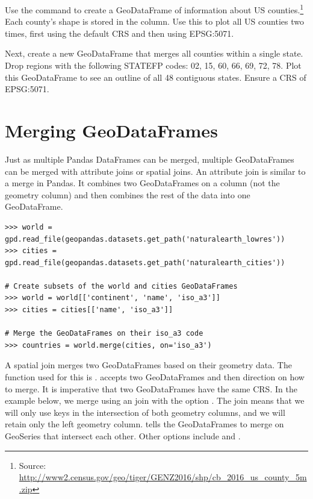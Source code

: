 \begin{problem}
Use the command  to create a GeoDataFrame of information about US counties.\footnote{Source: \url{http://www2.census.gov/geo/tiger/GENZ2016/shp/cb_2016_us_county_5m.zip}}
Each county's shape is stored in the  column.
Use this to plot all US counties two times, first using the default CRS and then using EPSG:5071.

Next, create a new GeoDataFrame that merges all counties within a single state.
Drop regions with the following STATEFP codes: 02, 15, 60, 66, 69, 72, 78.
Plot this GeoDataFrame to see an outline of all 48 contiguous states.
Ensure a CRS  of EPSG:5071.
\label{problem:us_counties}
\end{problem}

\section*{Merging GeoDataFrames} %

Just as multiple Pandas DataFrames can be merged, multiple GeoDataFrames can be merged with attribute joins or spatial joins.
An attribute join is similar to a merge in Pandas.
It combines two GeoDataFrames on a column (not the geometry column) and then combines the rest of the data into one GeoDataFrame.

\begin{lstlisting}
>>> world = gpd.read_file(geopandas.datasets.get_path('naturalearth_lowres'))
>>> cities = gpd.read_file(geopandas.datasets.get_path('naturalearth_cities'))

# Create subsets of the world and cities GeoDataFrames
>>> world = world[['continent', 'name', 'iso_a3']]
>>> cities = cities[['name', 'iso_a3']]

# Merge the GeoDataFrames on their iso_a3 code
>>> countries = world.merge(cities, on='iso_a3')
\end{lstlisting}

A spatial join merges two GeoDataFrames based on their geometry data.
The function used for this is .
 accepts two GeoDataFrames and then direction on how to merge.
It is imperative that two GeoDataFrames have the same CRS.
In the example below, we merge using an  join with the option .
The  join means that we will only use keys in the intersection of both geometry columns, and we will retain only the left geometry column.
 tells the GeoDataFrames to merge on GeoSeries that intersect each other.
Other options include  and .

